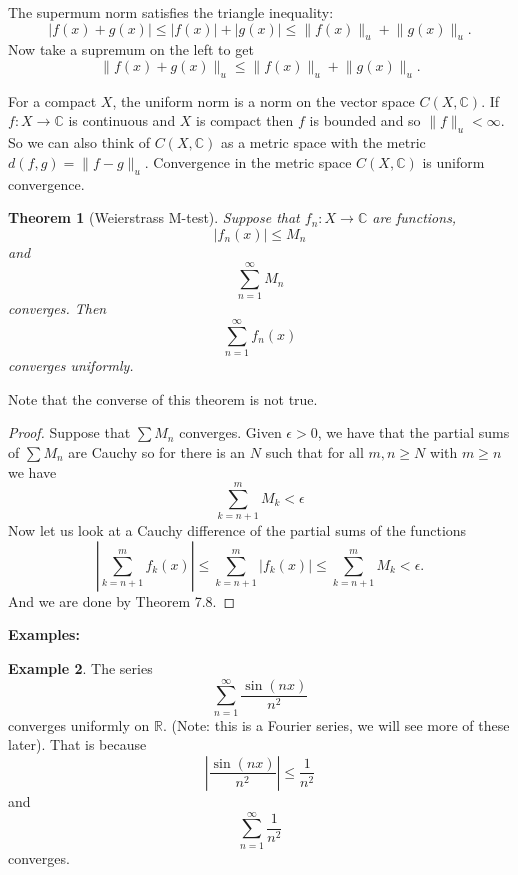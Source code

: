 \documentclass[12pt]{book}
\newcommand{\snorm}[1]{\lVert {#1} \rVert}
\newcommand{\abs}[1]{\left\lvert {#1} \right\rvert}
\newcommand{\C}{{\mathbb{C}}}
\newcommand{\R}{{\mathbb{R}}}
\newcommand{\myindex}[1]{#1\index{#1}}
\theoremstyle{plain}
\newtheorem{thm}{Theorem}[section]
\theoremstyle{remark}
\theoremstyle{definition}
\theoremstyle{exercise}
\theoremstyle{example}
\newtheorem{example}[thm]{Example}
\begin{document}
The supermum norm satisfies the triangle inequality:
\begin{equation*}
\abs{f(x)+g(x)} \leq
\abs{f(x)}+\abs{g(x)} \leq
\snorm{f(x)}_u+\snorm{g(x)}_u .
\end{equation*}
Now take a supremum on the left to get
\begin{equation*}
\snorm{f(x)+g(x)}_u \leq
\snorm{f(x)}_u+\snorm{g(x)}_u .
\end{equation*}

For a compact $X$,
the uniform norm is a norm on the vector space $C(X,\C)$.
If $f \colon X \to \C$ is continuous and $X$ is compact then $f$
is bounded and so $\snorm{f}_u < \infty$.
So we can also think of $C(X,\C)$ as a metric space with the
metric $d(f,g) = \snorm{f-g}_u$.
Convergence in the metric space $C(X,\C)$ is
uniform convergence.

\begin{thm}[\myindex{Weierstrass M-test}]
Suppose that $f_n \colon X \to \C$ are functions,
$$
\abs{f_n(x)}\leq M_n
$$
and
$$
\sum_{n=1}^\infty M_n
$$
converges.
Then
$$\sum_{n=1}^\infty f_n(x)$$
converges uniformly.
\end{thm}

Note that the converse of this theorem is not true.

\begin{proof}
Suppose that $\sum M_n$ converges.  Given $\epsilon > 0$,
we have that the partial sums of $\sum M_n$ are Cauchy so for
there is an $N$ such that for all $m, n \geq N$ with $m \geq n$ we have
$$
\sum_{k=n+1}^m M_k < \epsilon
$$
Now let us look at a Cauchy difference of the partial
sums of the functions
$$
\abs{\sum_{k=n+1}^m f_k(x)} \leq
\sum_{k=n+1}^m \abs{f_k(x)} \leq
\sum_{k=n+1}^m M_k < \epsilon .
$$
And we are done by Theorem 7.8.
\end{proof}

\textbf{Examples:}

\begin{example}
The series
\begin{equation*}
\sum_{n=1}^\infty \frac{\sin(nx)}{n^2}
\end{equation*}
converges uniformly on $\R$. (Note: this is a Fourier series,
we will see more of these later).  That is because
\begin{equation*}
\abs{\frac{\sin(nx)}{n^2}} \leq 
\frac{1}{n^2}
\end{equation*}
and
\begin{equation*}
\sum_{n=1}^\infty \frac{1}{n^2}
\end{equation*}
converges.
\end{example}
\end{document}
